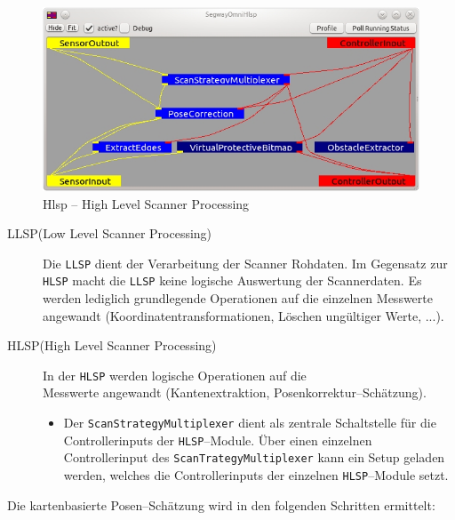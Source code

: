\begin{figure}[h]
\center
\includegraphics[scale=0.7]{graphics/Hlsp.jpg}
\caption{\label{fig:Hlsp}Hlsp -- High Level Scanner Processing}
\end{figure}
 
\begin{description}
\item[LLSP(Low Level Scanner Processing)] Die \lstinline{LLSP} dient der
Verarbeitung der Scanner Rohdaten. Im Gegensatz zur \lstinline{HLSP} macht die
\lstinline{LLSP} keine logische Auswertung der Scannerdaten.
 Es werden lediglich grundlegende Operationen auf die einzelnen Messwerte angewandt
 (Koordinatentransformationen, Löschen ungültiger Werte, ...).
\item[HLSP(High Level Scanner Processing)] In der \lstinline{HLSP} werden
logische Operationen auf die\\ Messwerte angewandt (Kantenextraktion,
Posenkorrektur--Schätzung).
\begin{itemize}
  \item Der \lstinline{ScanStrategyMultiplexer} dient als zentrale Schaltstelle
  für die Controllerinputs der \lstinline{HLSP}--Module.
  Über einen einzelnen Controllerinput des \lstinline{ScanTrategyMultiplexer}
  kann ein Setup geladen werden, welches die Controllerinputs der einzelnen
 \lstinline{HLSP}--Module setzt.
\end{itemize}
\end{description}

Die kartenbasierte Posen--Schätzung wird in den folgenden Schritten ermittelt:

